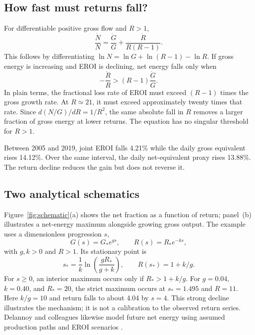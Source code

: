 \documentclass[reprint,aps,pra,longbibliography,floatfix]{revtex4-2}
\begin{document}
\subsection{How fast must returns fall?}
For differentiable positive gross flow and $R>1$,
\begin{equation}
 \frac{\dot N}{N}=\frac{\dot G}{G}+\frac{\dot R}{R(R-1)}.
 \label{eq:netgrowth}
\end{equation}
This follows by differentiating $\ln N=\ln G+\ln(R-1)-\ln R$. If gross energy is increasing and EROI is declining, net energy falls only when
\begin{equation}
 -\frac{\dot R}{R}>(R-1)\frac{\dot G}{G}.
 \label{eq:criterion}
\end{equation}
In plain terms, the fractional loss rate of EROI must exceed $(R-1)$ times the gross growth rate. At $R\simeq21$, it must exceed approximately twenty times that rate. Since $d(N/G)/dR=1/R^2$, the same absolute fall in $R$ removes a larger fraction of gross energy at lower returns. The equation has no singular threshold for $R>1$.

Between 2005 and 2019, joint EROI falls 4.21\% while the daily gross equivalent rises 14.12\%. Over the same interval, the daily net-equivalent proxy rises 13.88\%. The return decline reduces the gain but does not reverse it.

\subsection{Two analytical schematics}
Figure~\ref{fig:schematic}(a) shows the net fraction as a function of return; panel~(b) illustrates a net-energy maximum alongside growing gross output. The example uses a dimensionless progression $s$,
\begin{equation}
 G(s)=G_*e^{gs},\qquad R(s)=R_*e^{-ks},
\end{equation}
with $g,k>0$ and $R>1$. Its stationary point is
\begin{equation}
 s_*=\frac{1}{k}\ln\!\left(\frac{gR_*}{g+k}\right),\qquad
 R(s_*)=1+k/g.
\end{equation}
For $s\ge0$, an interior maximum occurs only if $R_*>1+k/g$. For $g=0.04$, $k=0.40$, and $R_*=20$, the strict maximum occurs at $s_*=1.495$ and $R=11$. Here $k/g=10$ and return falls to about 4.04 by $s=4$. This strong decline illustrates the mechanism; it is not a calibration to the observed return series. Delannoy and colleagues likewise model future net energy using assumed production paths and EROI scenarios \citep{delannoy2021}.
\end{document}
